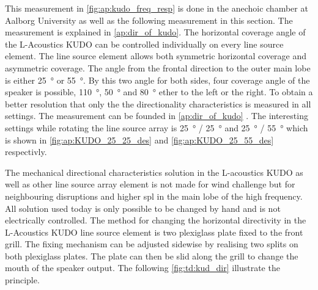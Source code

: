 This measurement in \autoref{fig:ap:kudo_freq_resp} is done in the anechoic chamber at Aalborg University as well as the following measurement in this section. The measurement is explained in \autoref{ap:dir_of_kudo}. The horizontal coverage angle of the L-Acoustics KUDO can be controlled individually on every line source element. The line source element allows both symmetric horizontal coverage and asymmetric coverage. The angle from the frontal direction to the outer main lobe  is either \SI{25}{\degree} or \SI{55}{\degree}. By this two angle for both sides, four coverage angle of the speaker is possible, \SI{110}{\degree}, \SI{50}{\degree} and \SI{80}{\degree} ether to the left or the right. To obtain a better resolution that only the  the directionality characteristics is measured in all settings. The measurement can be founded in \autoref{ap:dir_of_kudo} . The interesting settings while rotating the line source array is \SI{25}{\degree} / \SI{25}{\degree} and \SI{25}{\degree} / \SI{55}{\degree} which is shown in \autoref{fig:ap:KUDO_25_25_des} and \autoref{fig:ap:KUDO_25_55_des} respectivly.



The mechanical directional characteristics solution in the L-acoustics KUDO as well as other line source array element is not made for wind challenge but for neighbouring disruptions and higher \gls{spl} in the main lobe of the high frequency. All solution used today is only possible to be changed by hand and is not electrically controlled. The method for changing the horizontal directivity in the L-Acoustics KUDO line source element is two plexiglass plate fixed to the front grill. The fixing mechanism can be adjusted sidewise by realising two splits on both plexiglass plates. The plate can then be slid along the grill to change the mouth of the speaker output. The following \autoref{fig:td:kud_dir} illustrate the principle.

